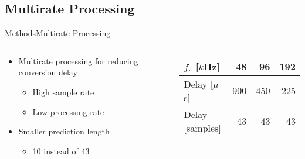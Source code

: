 \subsection{Multirate Processing}
\begin{frame}{Methods}{Multirate Processing}	
\begin{columns}
	\begin{column}{0.5\textwidth}
		\begin{itemize}
			\item Multirate processing for reducing conversion delay
			\begin{itemize}
				\item High sample rate
				\item Low processing rate
			\end{itemize}
			\item Smaller prediction length
			\begin{itemize}
				\item 10 instead of 43
			\end{itemize}
		\end{itemize}
	\end{column}
	\begin{column}{0.5\textwidth} 
		\begin{table}[H]
			\centering
			\begin{tabular}{|l|r|r|r|}
				\hline
				$f_s$ {[}$k$Hz{]} & 48 & 96 & 192 \\ \hline
				Delay {[}$\mu$s{]} & 900 & 450 & 225 \\ \hline
				Delay {[}samples{]} & 43 & 43 & 43 \\ \hline
			\end{tabular}
		\end{table}
	\end{column}
\end{columns}
\end{frame}




